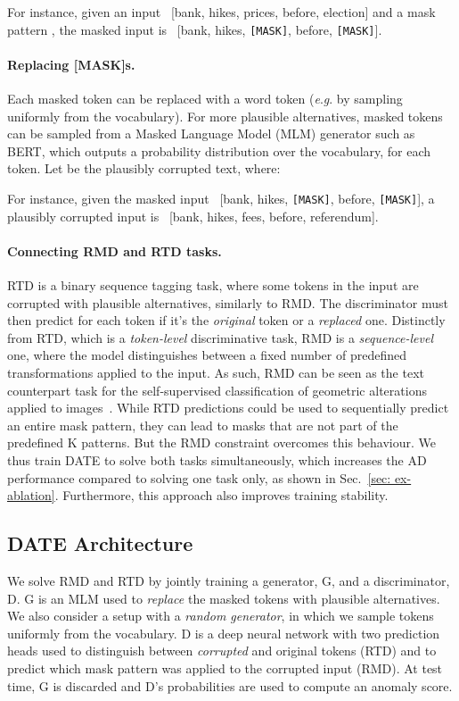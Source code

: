\documentclass[11pt]{article}
\newcommand{\eg}{\textit{e}.\textit{g}. }
\begin{document}
For instance, given an input ~[bank, hikes, prices, before, election] and a mask pattern , the masked input is ~[bank, hikes, \texttt{[MASK]}, before, \texttt{[MASK]}].


\paragraph{Replacing [MASK]s.} Each masked token can be replaced with a word token (\eg by sampling uniformly from the vocabulary). For more plausible alternatives, masked tokens can be sampled from a Masked Language Model (MLM) generator such as BERT, which outputs a probability distribution  over the vocabulary, for each token. Let  be the plausibly corrupted text, where:

For instance, given the masked input ~[bank, hikes, \texttt{[MASK]}, before, \texttt{[MASK]}], a plausibly corrupted input is ~[bank, hikes, fees, before, referendum].

\paragraph{Connecting RMD and RTD tasks.} RTD is a binary sequence tagging task, where some tokens in the input are corrupted with plausible alternatives, similarly to RMD. The discriminator must then predict for each token if it's the \emph{original} token or a \emph{replaced} one. Distinctly from RTD, which is a \emph{token-level} discriminative task, RMD is a \emph{sequence-level} one, where the model distinguishes between a fixed number of predefined transformations applied to the input. As such, RMD can be seen as the text counterpart task for the self-supervised classification of geometric alterations applied to images~\cite{Golan2018,neurips2019}. While RTD predictions could be used to sequentially predict an entire mask pattern, they can lead to masks that are not part of the predefined K patterns. But the RMD constraint overcomes this behaviour. We thus train DATE to solve both tasks simultaneously, which increases the AD performance compared to solving one task only, as shown in Sec.~\ref{sec: ex-ablation}. Furthermore, this approach also improves training stability.

\subsection{DATE Architecture}
We solve RMD and RTD by jointly training a generator, G, and a discriminator, D. G is an MLM used to \emph{replace} the masked tokens with plausible alternatives. We also consider a setup with a \emph{random generator}, in which we sample tokens uniformly from the vocabulary. D is a deep neural network with two prediction heads used to distinguish between \emph{corrupted} and original tokens (RTD) and to predict which mask pattern was applied to the corrupted input (RMD). At test time, G is discarded and D's probabilities are used to compute an anomaly score.
\end{document}
